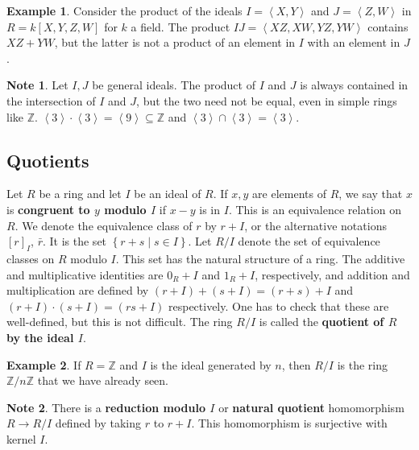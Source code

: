 \documentclass{article}
\newcommand{\Z}{\mathbb{Z}}
\newcommand{\rb}[1]{\left( #1 \right)}
\renewcommand{\sb}[1]{\left[ #1 \right]}
\newcommand{\cb}[1]{\left\{ #1 \right\}}
\newcommand{\ab}[1]{\left\langle #1 \right\rangle}
\theoremstyle{definition}\newtheorem{definition}{Definition}[subsection]
\theoremstyle{definition}\newtheorem{remark}[definition]{Remark}
\theoremstyle{definition}\newtheorem*{example}{Example}
\theoremstyle{definition}\newtheorem*{note}{Note}
\begin{document}
\begin{example}
Consider the product of the ideals $ I = \ab{X, Y} $ and $ J = \ab{Z, W} $ in $ R = k\sb{X, Y, Z, W} $ for $ k $ a field. The product $ IJ = \ab{XZ, XW, YZ, YW} $ contains $ XZ + YW $, but the latter is not a product of an element in $ I $ with an element in $ J $.
\end{example}

\begin{note}
Let $ I, J $ be general ideals. The product of $ I $ and $ J $ is always contained in the intersection of $ I $ and $ J $, but the two need not be equal, even in simple rings like $ \Z $. $ \ab{3} \cdot \ab{3} = \ab{9} \subseteq \Z $ and $ \ab{3} \cap \ab{3} = \ab{3} $.
\end{note}

\subsection{Quotients}

Let $ R $ be a ring and let $ I $ be an ideal of $ R $. If $ x, y $ are elements of $ R $, we say that $ x $ is \textbf{congruent to $ y $ modulo $ I $} if $ x - y $ is in $ I $. This is an equivalence relation on $ R $. We denote the equivalence class of $ r $ by $ r + I $, or the alternative notations $ \sb{r}_I $, $ \bar{r} $. It is the set $ \cb{r + s \mid s \in I} $. Let $ R / I $ denote the set of equivalence classes on $ R $ modulo $ I $. This set has the natural structure of a ring. The additive and multiplicative identities are $ 0_R + I $ and $ 1_R + I $, respectively, and addition and multiplication are defined by $ \rb{r + I} + \rb{s + I} = \rb{r + s} + I $ and $ \rb{r + I} \cdot \rb{s + I} = \rb{rs + I} $ respectively. One has to check that these are well-defined, but this is not difficult. The ring $ R / I $ is called the \textbf{quotient of $ R $ by the ideal $ I $}.

\begin{example}
If $ R = \Z $ and $ I $ is the ideal generated by $ n $, then $ R / I $ is the ring $ \Z / n\Z $ that we have already seen.
\end{example}

\begin{note}
There is a \textbf{reduction modulo $ I $} or \textbf{natural quotient} homomorphism $ R \to R / I $ defined by taking $ r $ to $ r + I $. This homomorphism is surjective with kernel $ I $.
\end{note}
\end{document}
